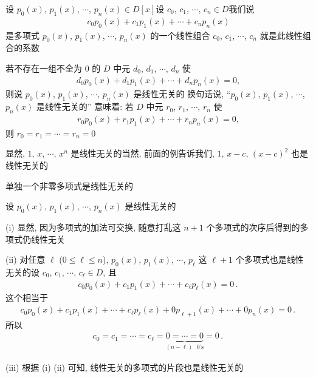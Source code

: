 \begin{definition}
    设 $p_0 (x)$, $p_1 (x)$, $\cdots$, $p_n (x) \in D[x]$\period 设 $c_0$, $c_1$, $\cdots$, $c_n \in D$\period 我们说
    \begin{align*}
        c_0 p_0 (x) + c_1 p_1 (x) + \cdots + c_n p_n (x)
    \end{align*}
    是多项式 $p_0 (x)$, $p_1 (x)$, $\cdots$, $p_n (x)$ 的一个线性组合 \period $c_0$, $c_1$, $\cdots$, $c_n$ 就是此线性组合的系数\period

    若不存在一组不全为 $0$ 的 $D$ 中元 $d_0$, $d_1$, $\cdots$, $d_n$ 使
    \begin{align*}
        d_0 p_0 (x) + d_1 p_1 (x) + \cdots + d_n p_n (x) = 0,
    \end{align*}
    则说 $p_0 (x)$, $p_1 (x)$, $\cdots$, $p_n (x)$ 是线性无关的 \period 换句话说, ``$p_0 (x)$, $p_1 (x)$, $\cdots$, $p_n (x)$ 是线性无关的'' 意味着: 若 $D$ 中元 $r_0$, $r_1$, $\cdots$, $r_n$ 使
    \begin{align*}
        r_0 p_0 (x) + r_1 p_1 (x) + \cdots + r_n p_n (x) = 0,
    \end{align*}
    则 $r_0 = r_1 = \cdots = r_n = 0$\period
\end{definition}

\begin{example}
    显然, $1$, $x$, $\cdots$, $x^n$ 是线性无关的\period 当然, 前面的例告诉我们, $1$, $x-c$, $(x-c)^2$ 也是线性无关的\period
\end{example}

\begin{example}
    单独一个非零多项式是线性无关的\period
\end{example}

\begin{remark}
    设 $p_0 (x)$, $p_1 (x)$, $\cdots$, $p_n (x)$ 是线性无关的\period

    (i) 显然, 因为多项式的加法可交换, 随意打乱这 $n+1$ 个多项式的次序后得到的多项式仍线性无关\period

    (ii) 对任意 $\ell$ ($0 \leq \ell \leq n$), $p_0 (x)$, $p_1 (x)$, $\cdots$, $p_{\ell}$ 这 $\ell + 1$ 个多项式也是线性无关的\period 设 $c_0$, $c_1$, $\cdots$, $c_\ell \in D$, 且
    \begin{align*}
        c_0 p_0 (x) + c_1 p_1 (x) + \cdots + c_\ell p_\ell (x) = 0 \period
    \end{align*}
    这个相当于
    \begin{align*}
        c_0 p_0 (x) + c_1 p_1 (x) + \cdots + c_\ell p_\ell (x) + 0 p_{\ell+1} (x) + \cdots + 0 p_n (x) = 0 \period
    \end{align*}
    所以
    \begin{align*}
        c_0 = c_1 = \cdots = c_\ell = \underbrace{0 = \cdots = 0}_{(n - \ell)\text{ $0$'s}} = 0 \period
    \end{align*}

    (iii) 根据 (i) (ii) 可知, 线性无关的多项式的片段也是线性无关的\period
\end{remark}

